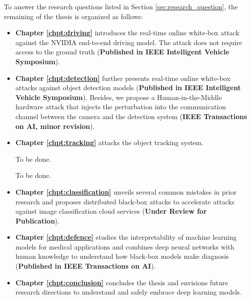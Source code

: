 To answer the research questions listed in Section \ref{sec:research_question}, the remaining of the thesis is organized as follows:


\begin{itemize}[label={}]
    \item \textbf{Chapter \ref{chpt:driving}} introduces the real-time online white-box attack against the NVIDIA end-to-end driving model. The attack does not require access to the ground truth (\textbf{Published in IEEE Intelligent Vehicle Symposium}).
    \item \textbf{Chapter \ref{chpt:detection}} further presents real-time online white-box attacks against object detection models (\textbf{Published in IEEE Intelligent Vehicle Symposium}). Besides, we propose a Human-in-the-Middle hardware attack that injects the perturbation into the communication channel between the camera and the detection system (\textbf{IEEE Transactions on AI, minor revision}).
    \item \textbf{Chapter \ref{chpt:tracking}} attacks the object tracking system.

    To be done.

    To be done.

    \item \textbf{Chapter \ref{chpt:classification}} unveils several common mistakes in prior research and proposes distributed black-box attacks to accelerate attacks against image classification cloud services (\textbf{Under Review for Publication}).
    \item \textbf{Chapter \ref{chpt:defence}} studies the interpretability of machine learning models for medical applications and combines deep neural networks with human knowledge to understand how black-box models make diagnosis (\textbf{Published in IEEE Transactions on AI}).
    \item \textbf{Chapter \ref{chpt:conclusion}} concludes the thesis and envisions future research directions to understand and safely embrace deep learning models. 
\end{itemize}


